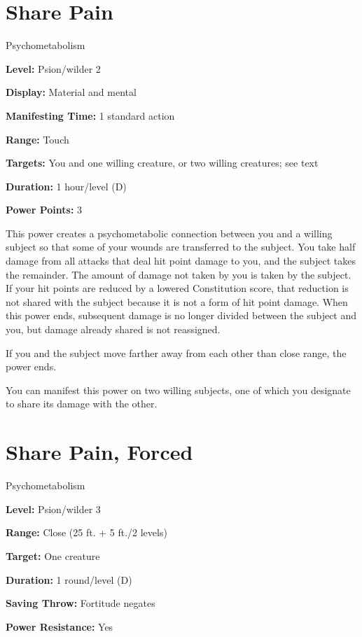 \documentclass{article}
\begin{document}
\section*{Share Pain}

Psychometabolism

\textbf{Level:} Psion/wilder 2

\textbf{Display:} Material and mental

\textbf{Manifesting Time:} 1 standard action

\textbf{Range:} Touch

\textbf{Targets:} You and one willing creature, or two willing creatures; see text

\textbf{Duration:} 1 hour/level (D)

\textbf{Power Points:} 3

This power creates a psychometabolic connection between you and a willing subject 
so that some of your wounds are transferred to the subject. You take half damage 
from all attacks that deal hit point damage to you, and the subject takes the remainder. 
The amount of damage not taken by you is taken by the subject. If your hit points 
are reduced by a lowered Constitution score, that reduction is not shared with 
the subject because it is not a form of hit point damage. When this power ends, 
subsequent damage is no longer divided between the subject and you, but damage 
already shared is not reassigned.

If you and the subject move farther away from each other than close range, the 
power ends.

You can manifest this power on two willing subjects, one of which you designate 
to share its damage with the other.

\vspace{12pt}
\section*{Share Pain, Forced}

Psychometabolism

\textbf{Level:} Psion/wilder 3

\textbf{Range:} Close (25 ft. + 5 ft./2 levels)

\textbf{Target:} One creature

\textbf{Duration:} 1 round/level (D)

\textbf{Saving Throw:} Fortitude negates

\textbf{Power Resistance:} Yes
\end{document}
